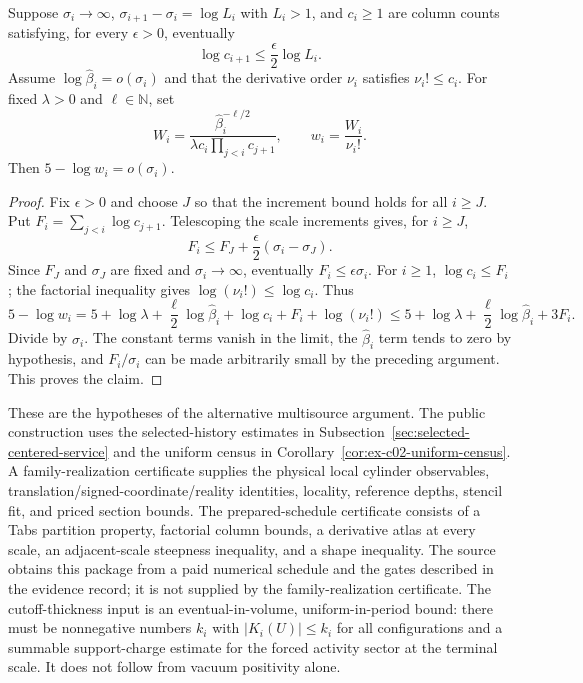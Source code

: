 \begin{lemma}\label{ex-centered-width-bill}
Suppose $\sigma_i\to\infty$, $\sigma_{i+1}-\sigma_i=\log L_i$ with $L_i>1$, and $c_i\geq1$ are column counts satisfying, for every $\epsilon>0$, eventually
\[
 \log c_{i+1}\leq\frac{\epsilon}{2}\log L_i.
\]
Assume $\log\widehat\beta_i=o(\sigma_i)$ and that the derivative order $\nu_i$ satisfies $\nu_i!\leq c_i$. For fixed $\lambda>0$ and $\ell\in\mathbb N$, set
\[
 W_i=\frac{\widehat\beta_i^{-\ell/2}}
 {\lambda c_i\prod_{j<i}c_{j+1}},\qquad w_i=\frac{W_i}{\nu_i!}.
\]
Then $5-\log w_i=o(\sigma_i)$.
\end{lemma}
\begin{proof}
Fix $\epsilon>0$ and choose $J$ so that the increment bound holds for all $i\geq J$. Put $F_i=\sum_{j<i}\log c_{j+1}$. Telescoping the scale increments gives, for $i\geq J$,
\[
 F_i\leq F_J+\frac{\epsilon}{2}(\sigma_i-\sigma_J).
\]
Since $F_J$ and $\sigma_J$ are fixed and $\sigma_i\to\infty$, eventually $F_i\leq\epsilon\sigma_i$. For $i\geq1$, $\log c_i\leq F_i$; the factorial inequality gives $\log(\nu_i!)\leq\log c_i$. Thus
\[
 5-\log w_i
 =5+\log\lambda+\frac{\ell}{2}\log\widehat\beta_i
   +\log c_i+F_i+\log(\nu_i!)
 \leq5+\log\lambda+\frac{\ell}{2}\log\widehat\beta_i+3F_i.
\]
Divide by $\sigma_i$. The constant terms vanish in the limit, the $\widehat\beta_i$ term tends to zero by hypothesis, and $F_i/\sigma_i$ can be made arbitrarily small by the preceding argument. This proves the claim.
\end{proof}

These are the hypotheses of the alternative multisource argument. The
public construction uses the selected-history estimates in
Subsection~\ref{sec:selected-centered-service} and the uniform census in
Corollary~\ref{cor:ex-c02-uniform-census}. A family-realization certificate supplies the physical local cylinder observables, translation/signed-coordinate/reality identities, locality, reference depths, stencil fit, and priced section bounds. The prepared-schedule certificate consists of a Tabs partition property, factorial column bounds, a derivative atlas at every scale, an adjacent-scale steepness inequality, and a shape inequality. The source obtains this package from a paid numerical schedule and the gates described in the evidence record; it is not supplied by the family-realization certificate. The cutoff-thickness input is an eventual-in-volume, uniform-in-period bound: there must be nonnegative numbers $k_i$ with $|K_i(U)|\leq k_i$ for all configurations and a summable support-charge estimate for the forced activity sector at the terminal scale. It does not follow from vacuum positivity alone.

